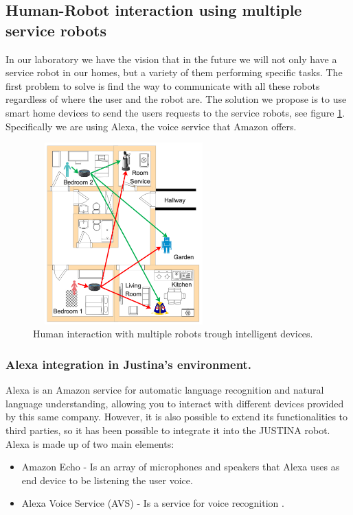\documentclass{llncs}
\begin{document}
\subsection{Human-Robot interaction using multiple service robots}\label{subsec:Alexa}

In our laboratory we have the vision that in the future we will not only have a service robot in our homes, 
but a variety of them performing specific tasks. The first problem to solve is find the way to communicate with all these robots regardless of where the user and the robot are.
The solution we propose is to use smart home devices to send the users requests to the service robots, see figure \ref{fig:alexahome}. 
Specifically we are using Alexa, 
the voice service that Amazon offers.

\begin{figure}[h]
	\centering
	\includegraphics[angle=0, height=7cm, width=7cm]{Figures/alexa1.png}
	\caption{Human interaction with multiple robots trough intelligent devices.}
	\label{fig:alexahome}
\end{figure}

\subsubsection{Alexa integration in Justina's environment.} Alexa is an Amazon service for automatic language recognition and natural language understanding, allowing you to interact with different devices provided by this same company. However, it is also possible to extend its functionalities to third parties, so it has been possible to integrate it into the JUSTINA robot. Alexa is made up of two main elements:
\begin{itemize}
	 \item Amazon Echo - Is an array of microphones and speakers that Alexa uses as end device to be listening the user voice.
	 \item Alexa Voice Service (AVS) - Is a service for voice recognition \cite{avs}.
\end{itemize}
\end{document}
